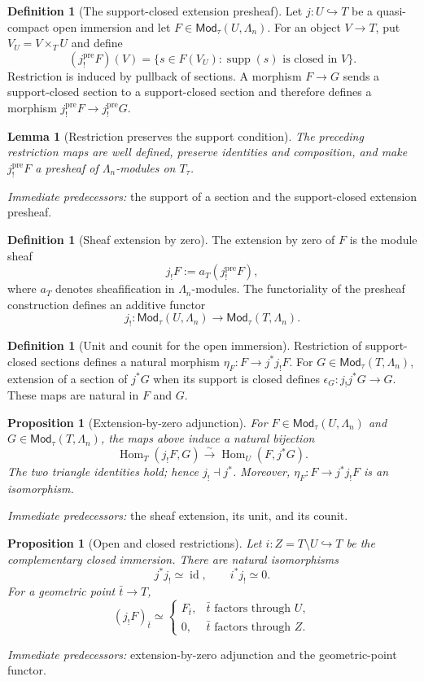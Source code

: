 \documentclass[10pt]{article}
\newtheorem{proposition}[theorem]{Proposition}
\newtheorem{lemma}[theorem]{Lemma}
\theoremstyle{definition}
\newtheorem{definition}[theorem]{Definition}
\newcommand{\Mod}{\mathsf{Mod}}
\newcommand{\Hom}{\operatorname{Hom}}
\newcommand{\pred}[1]{\par\smallskip\begingroup\footnotesize\raggedright
\emph{Immediate predecessors:} #1.\par\endgroup}
\begin{document}
\begin{definition}[The support-closed extension presheaf]
Let \(j:U\hookrightarrow T\) be a quasi-compact open immersion and let
\(F\in\Mod_\tau(U,\Lambda_n)\).  For an object \(V\to T\), put
\(V_U=V\times_TU\) and define
\[
 (j^{\mathrm{pre}}_!F)(V)=
 \{s\in F(V_U):\operatorname{supp}(s)\text{ is closed in }V\}.
\]
Restriction is induced by pullback of sections.  A morphism \(F\to G\)
sends a support-closed section to a support-closed section and therefore
defines a morphism \(j^{\mathrm{pre}}_!F\to j^{\mathrm{pre}}_!G\).
\end{definition}

\begin{lemma}[Restriction preserves the support condition]
The preceding restriction maps are well defined, preserve identities and
composition, and make \(j^{\mathrm{pre}}_!F\) a presheaf of
\(\Lambda_n\)-modules on \(T_\tau\).
\end{lemma}
\pred{the support of a section and the support-closed extension presheaf}

\begin{definition}[Sheaf extension by zero]
The extension by zero of \(F\) is the module sheaf
\[
 j_!F:=a_T(j^{\mathrm{pre}}_!F),
\]
where \(a_T\) denotes sheafification in \(\Lambda_n\)-modules.  The
functoriality of the presheaf construction defines an additive functor
\[
 j_!: \Mod_\tau(U,\Lambda_n)\longrightarrow
       \Mod_\tau(T,\Lambda_n).
\]
\end{definition}

\begin{definition}[Unit and counit for the open immersion]
Restriction of support-closed sections defines a natural morphism
\(\eta_F:F\to j^*j_!F\).  For \(G\in\Mod_\tau(T,\Lambda_n)\), extension of
a section of \(j^*G\) when its support is closed defines
\(\epsilon_G:j_!j^*G\to G\).  These maps are natural in \(F\) and \(G\).
\end{definition}

\begin{proposition}[Extension-by-zero adjunction]
For \(F\in\Mod_\tau(U,\Lambda_n)\) and
\(G\in\Mod_\tau(T,\Lambda_n)\), the maps above induce a natural bijection
\[
 \Hom_T(j_!F,G)\xrightarrow{\sim}\Hom_U(F,j^*G).
\]
The two triangle identities hold; hence \(j_!\dashv j^*\).  Moreover,
\(\eta_F:F\to j^*j_!F\) is an isomorphism.
\end{proposition}
\pred{the sheaf extension, its unit, and its counit}

\begin{proposition}[Open and closed restrictions]
Let \(i:Z=T\setminus U\hookrightarrow T\) be the complementary closed
immersion.  There are natural isomorphisms
\[
 j^*j_!\simeq\operatorname{id},\qquad i^*j_!\simeq0.
\]
For a geometric point \(\bar t\to T\),
\[
 (j_!F)_{\bar t}\simeq
 \begin{cases}
 F_{\bar t},&\bar t\text{ factors through }U,\\
 0,&\bar t\text{ factors through }Z.
 \end{cases}
\]
\end{proposition}
\pred{extension-by-zero adjunction and the geometric-point functor}
\end{document}
